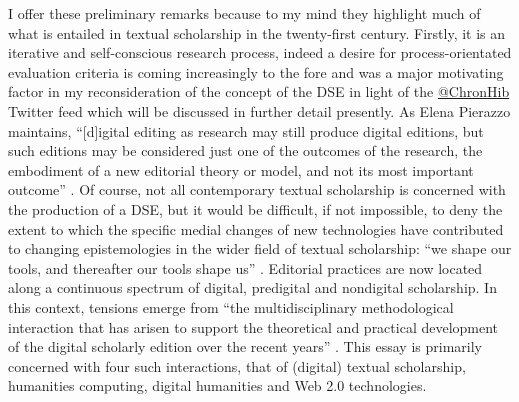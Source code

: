 \begin{paper}
I offer these preliminary remarks because to my mind they highlight much of what is entailed in textual scholarship in the twenty-first century. Firstly, it is an iterative and self-conscious research process, indeed a desire for process-orientated evaluation criteria is coming increasingly to the fore and was a major motivating factor in my reconsideration of the concept of the DSE in light of the \href{https://twitter.com/chronhib}{@ChronHib} Twitter feed which will be discussed in further detail presently. As Elena Pierazzo maintains, ``[d]igital editing as research may still produce digital editions, but such editions may be considered just one of the outcomes of the research, the embodiment of a new editorial theory or model, and not its most important outcome'' \citep[217]{pierazzo_digital_2014}. Of course, not all contemporary textual scholarship is concerned with the production of a DSE, but it would be difficult, if not impossible, to deny the extent to which the specific medial changes of new technologies have contributed to changing epistemologies in the wider field of textual scholarship: ``we shape our tools, and thereafter our tools shape us'' \citep[3]{pierazzo_modelling_2016}. Editorial practices are now located along a continuous spectrum of digital, predigital and nondigital scholarship. In this context, tensions emerge from ``the multidisciplinary methodological interaction that has arisen to support the theoretical and practical development of the digital scholarly edition over the recent years'' \citep[83]{zundert_barely_2016}. This essay is primarily concerned with four such interactions, that of (digital) textual scholarship, humanities computing, digital humanities and Web 2.0 technologies. 


\end{paper}
